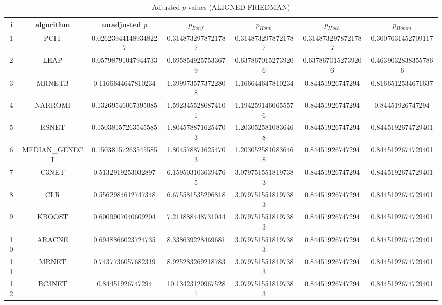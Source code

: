 \documentclass[a4paper,10pt]{article}
\begin{document}
\begin{landscape}
\begin{table}[!htp]
\centering\scriptsize
\caption{Adjusted $p$-values (ALIGNED FRIEDMAN)}
\begin{tabular}{ccccccc}
i&algorithm&unadjusted $p$&$p_{Bonf}$&$p_{Holm}$&$p_{Hoch}$&$p_{Homm}$\\
\hline
1&PCIT&0.026239441489348227&0.3148732978721787&0.3148732978721787&0.3148732978721787&0.3007631452709117\\
2&LEAP&0.05798791047944733&0.6958549257533679&0.6378670152739206&0.6378670152739206&0.46390328383557866\\
3&MRNETB&0.1166644647810234&1.3999735773722808&1.166644647810234&0.84451926747294&0.8166512534671637\\
4&NARROMI&0.13269546067395085&1.5923455280874101&1.1942591460655576&0.84451926747294&0.84451926747294\\
5&RSNET&0.15038157263545585&1.8045788716254703&1.2030525810836468&0.84451926747294&0.8445192674729401\\
6&MEDIAN_GENECI&0.15038157263545585&1.8045788716254703&1.2030525810836468&0.84451926747294&0.8445192674729401\\
7&C3NET&0.5132919253032897&6.1595031036394765&3.0797515518197383&0.84451926747294&0.8445192674729401\\
8&CLR&0.5562984612747348&6.675581535296818&3.0797515518197383&0.84451926747294&0.8445192674729401\\
9&KBOOST&0.6009907040609204&7.211888448731044&3.0797515518197383&0.84451926747294&0.8445192674729401\\
10&ARACNE&0.6948866023724735&8.338639228469681&3.0797515518197383&0.84451926747294&0.8445192674729401\\
11&MRNET&0.7437736057682319&8.925283269218783&3.0797515518197383&0.84451926747294&0.8445192674729401\\
12&BC3NET&0.84451926747294&10.134231209675281&3.0797515518197383&0.84451926747294&0.8445192674729401\\
\hline
\end{tabular}
\end{table}


\end{landscape}
\end{document}
